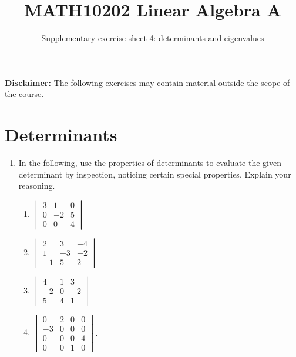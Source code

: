 \documentclass[english,12pt,a4paper]{scrartcl}
\title{MATH10202 Linear Algebra A}
\subtitle{Supplementary exercise sheet 4: determinants and eigenvalues}
\author{}
\date{\vspace{-4.5ex}}
\begin{document}
\maketitle

\vspace{-5ex}
\noindent \textbf{Disclaimer:} The following exercises may contain material 
outside the scope of the course.

\section*{Determinants}
\begin{enumerate}
  \item %
    In the following, use the properties of determinants to evaluate the given 
    determinant by inspection, noticing certain special properties.  Explain 
    your reasoning.
    \begin{multicols}{4}
      \begin{enumerate}
        \item $
          \begin{vmatrix}
            3 & 1 & 0 \\
            0 & -2 & 5 \\
            0 & 0 & 4
          \end{vmatrix}
          $
        \item $
          \begin{vmatrix}
            2 & 3 & -4 \\
            1 & -3 & -2 \\
            -1 & 5 & 2
          \end{vmatrix}
          $
        \item $
          \begin{vmatrix}
            4 & 1 & 3 \\
            -2 & 0 & -2 \\
            5 & 4 & 1
          \end{vmatrix}
          $
        \item $
          \begin{vmatrix}
            0 & 2 & 0 & 0 \\
            -3 & 0 & 0 & 0 \\
            0 & 0 & 0 & 4 \\
            0 & 0 & 1 & 0
          \end{vmatrix}
          $.
      \end{enumerate}
    \end{multicols}

\end{enumerate}
\end{document}
